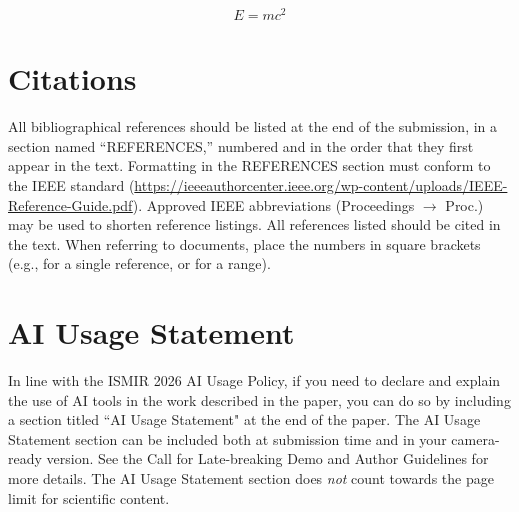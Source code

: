 \documentclass{article}
\begin{document}
\begin{equation}\label{relativity}
E=mc^{2}
\end{equation}

\section{Citations}

All bibliographical references should be listed at the end of the submission, in a section named ``REFERENCES,''
numbered and in the order that they first appear in the text. Formatting in the REFERENCES section must conform to the
IEEE standard (\url{https://ieeeauthorcenter.ieee.org/wp-content/uploads/IEEE-Reference-Guide.pdf}). Approved
IEEE abbreviations (Proceedings $\rightarrow$ Proc.) may be used to shorten reference listings. All references listed
should be cited in the text. When referring to documents, place the numbers in square brackets (e.g., \cite{ISMIR17Author:01}
for a single reference, or \cite{JNMR10Someone:01,Book20Person:01,Chapter09Person:01} for a range).


\section{AI Usage Statement}

In line with the ISMIR 2026 AI Usage Policy, if you need to declare and explain the use of AI tools in the work described in the paper, you can do so by including a section titled ``AI Usage Statement" at the end of the paper. The AI Usage Statement section can be included both at submission time and in your camera-ready version. See the Call for Late-breaking Demo and Author Guidelines for more details. The AI Usage Statement section does \textit{not} count towards the page limit for scientific content. 




%
%
%
%
%
\end{document}
